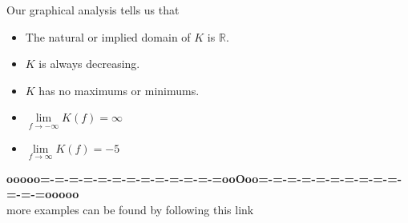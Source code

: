 \documentclass{ximera}
\begin{document}
\begin{example}
\begin{image}
\end{image}





Our graphical analysis tells us that

\begin{itemize}
\item The natural or implied domain of $K$ is $\mathbb{R}$.
\item $K$ is always decreasing.
\item $K$ has no maximums or minimums.
\item $\lim\limits_{f \to -\infty} K(f) = \infty$
\item $\lim\limits_{f \to \infty} K(f) = -5$
\end{itemize}


\end{example}
















\begin{center}
\textbf{\textcolor{green!50!black}{ooooo=-=-=-=-=-=-=-=-=-=-=-=-=ooOoo=-=-=-=-=-=-=-=-=-=-=-=-=ooooo}} \\

more examples can be found by following this link\\ 

\end{center}
\end{document}
